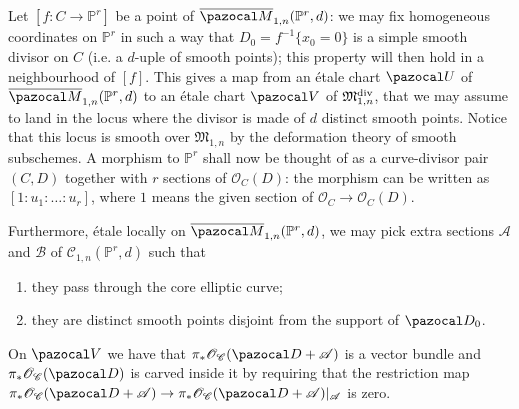 \documentclass[11pt]{amsart}
\newcommand{\M}[4]{\overline{\pazocal M}_{#1,#2}(#3,#4)}
\newcommand{\PP}{\mathbb P}
\newcommand{\OO}{\mathcal O}
\renewcommand{\to}{\rightarrow}
\newcommand{\cC}{\mathcal C}
\theoremstyle{plain}
\theoremstyle{definition}
\begin{document}
Let $[f\colon C\to \PP^r]$ be a point of $\M{1}{n}{\PP^r}{d}$: we may fix homogeneous coordinates on $\PP^r$ in such a way that $D_0=f^{-1}\{x_0=0\}$ is a simple smooth divisor on $C$ (i.e. a $d$-uple of smooth points); this property will then hold in a neighbourhood of $[f]$. This gives a map from an \'{e}tale chart $\pazocal U$ of $\M{1}{n}{\PP^r}{d}$ to an \'{e}tale chart $\pazocal V$ of $\mathfrak M_{1,n}^{\rm{div}}$, that we may assume to land in the locus where the divisor is made of $d$ distinct smooth points. Notice that this locus is smooth over $\mathfrak M_{1,n}$ by the deformation theory of smooth subschemes. A morphism to $\PP^r$ shall now be thought of as a curve-divisor pair $(C,D)$ together with $r$ sections of $\mathcal O_C(D)$: the morphism can be written as $[1:u_1:\ldots:u_r]$, where $1$ means the given section of $\mathcal O_C\to\mathcal O_C(D)$.


Furthermore, \'{e}tale locally on $\M{1}{n}{\PP^r}{d}$, we may pick extra sections $\mathcal A$ and $\mathcal B$ of $\mathcal C_{1,n}(\PP^r,d)$ such that 
\begin{enumerate}
\item they pass through the core elliptic curve;
\item they are distinct smooth points disjoint from the support of $\pazocal D_0$. 
\end{enumerate}
On  $\pazocal V$ we have that  $\pi_*\OO_{\cC}(\pazocal D+\mathcal A)$ is a vector bundle and $\pi_*\OO_{\cC}(\pazocal D)$ is carved inside it by requiring that the restriction map $\pi_*\OO_{\cC}(\pazocal D+\mathcal A)\to\pi_*\OO_{\cC}(\pazocal D+\mathcal A)\rvert_{\mathcal A}$ is zero.
\end{document}
